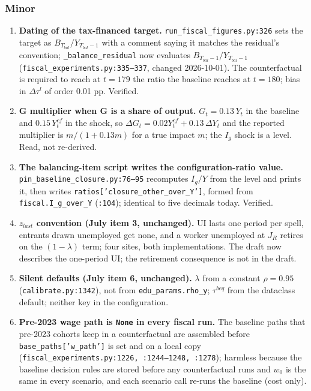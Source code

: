 \documentclass[11pt,a4paper]{article}
\newcommand{\code}[1]{\texttt{#1}}
\begin{document}
\subsubsection*{Minor}

\begin{enumerate}[label=m\arabic*.]
\item \textbf{Dating of the tax-financed target.} \code{run_fiscal_figures.py:326} sets the target as $B_{T_{bal}}/Y_{T_{bal}-1}$ with a comment saying it matches the residual's convention; \code{_balance_residual} now evaluates $B_{T_{bal}-1}/Y_{T_{bal}-1}$ (\code{fiscal_experiments.py:335--337}, changed 2026-10-01). The counterfactual is required to reach at $t = 179$ the ratio the baseline reaches at $t = 180$; bias in $\Delta\tau^l$ of order 0.01 pp. Verified.
\item \textbf{G multiplier when G is a share of output.} $G_t = 0.13\,Y_t$ in the baseline and $0.15\,Y^{cf}_t$ in the shock, so $\Delta G_t = 0.02 Y^{cf}_t + 0.13\,\Delta Y_t$ and the reported multiplier is $m/(1 + 0.13 m)$ for a true impact $m$; the $I_g$ shock is a level. Read, not re-derived.
\item \textbf{The balancing-item script writes the configuration-ratio value.} \code{pin_baseline_closure.py:76--95} recomputes $I_g/Y$ from the level and prints it, then writes \code{ratios['closure_other_over_Y']}, formed from \code{fiscal.I_g_over_Y} (\code{:104}); identical to five decimals today. Verified.
\item \textbf{$z_{last}$ convention (July item 3, unchanged).} UI lasts one period per spell, entrants drawn unemployed get none, and a worker unemployed at $J_R$ retires on the $(1-\lambda)$ term; four sites, both implementations. The draft now describes the one-period UI; the retirement consequence is not in the draft.
\item \textbf{Silent defaults (July item 6, unchanged).} $\lambda$ from a constant $\hat\rho = 0.95$ (\code{calibrate.py:1342}), not from \code{edu_params.rho_y}; $\tau^{beq}$ from the dataclass default; neither key in the configuration.
\item \textbf{Pre-2023 wage path is \code{None} in every fiscal run.} The baseline paths that pre-2023 cohorts keep in a counterfactual are assembled before \code{base_paths['w_path']} is set and on a local copy (\code{fiscal_experiments.py:1226, :1244--1248, :1278}); harmless because the baseline decision rules are stored before any counterfactual runs and $w_0$ is the same in every scenario, and each scenario call re-runs the baseline (cost only).

\end{enumerate}
\end{document}
